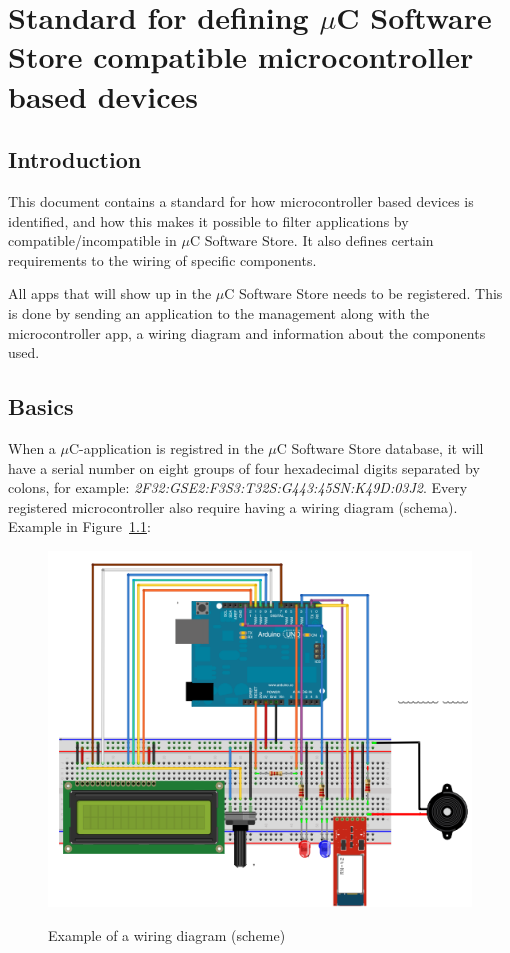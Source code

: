 \chapter{Standard for defining $\mu$C Software Store compatible microcontroller based devices}
\label{microcontroller_standard}
\section{Introduction}
This document contains a standard for how microcontroller based devices is identified, and how this makes it possible to filter applications by compatible/incompatible in $\mu$C Software Store. It also defines certain requirements to the wiring of specific components.

All apps that will show up in the $\mu$C Software Store needs to be registered. This is done by sending an application to the management along with the microcontroller app, a wiring diagram and information about the components used.

\section{Basics}
When a $\mu$C-application is registred in the $\mu$C Software Store database, it will have a serial number on eight groups of four hexadecimal digits separated by colons, for example: \textit{2F32:GSE2:F3S3:T32S:G443:45SN:K49D:03J2}. Every registered microcontroller also require having a wiring diagram (schema). Example in Figure~\ref{fig:wiring_simple}:

\begin{figure}[H]
\caption{Example of a wiring diagram (scheme)}
\centering
\includegraphics[scale=0.8]{images/wiring_diagram.png}
\label{fig:wiring_simple}
\end{figure}

